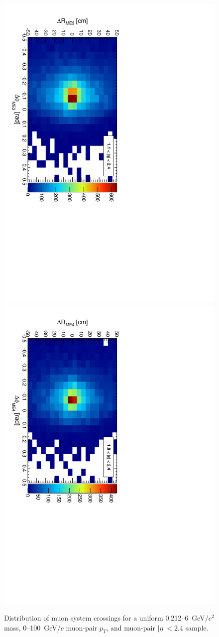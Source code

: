\documentclass[12pt]{article}
\begin{document}
\begin{figure}[p]
\begin{center}
\includegraphics[height=0.45\linewidth, angle=90]{fig/acceptance_plot/me3_TrackerMuons_denominator.pdf}
\includegraphics[height=0.45\linewidth, angle=90]{fig/acceptance_plot/me4_TrackerMuons_denominator.pdf}
\end{center}
\caption{Distribution of muon system crossings for a uniform
  \mbox{0.212--6~GeV/$c^2$} mass, \mbox{0--100~GeV/$c$} muon-pair $p_T$, and muon-pair $|\eta| < 2.4$
  sample.}
\end{figure}

\clearpage
\end{document}
